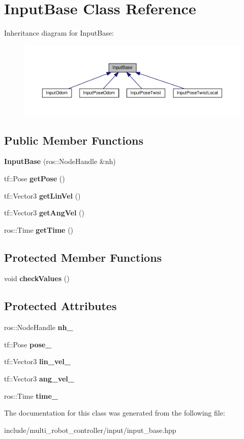 \hypertarget{classInputBase}{}\section{Input\+Base Class Reference}
\label{classInputBase}


Inheritance diagram for Input\+Base\+:
\nopagebreak
\begin{figure}[H]
\begin{center}
\leavevmode
\includegraphics[width=350pt]{d8/d2a/classInputBase__inherit__graph}
\end{center}
\end{figure}
\subsection*{Public Member Functions}
\begin{DoxyCompactItemize}
\item 
{\bfseries Input\+Base} (ros\+::\+Node\+Handle \&nh)
\item 
tf\+::\+Pose {\bfseries get\+Pose} ()
\item 
tf\+::\+Vector3 {\bfseries get\+Lin\+Vel} ()
\item 
tf\+::\+Vector3 {\bfseries get\+Ang\+Vel} ()
\item 
ros\+::\+Time {\bfseries get\+Time} ()
\end{DoxyCompactItemize}
\subsection*{Protected Member Functions}
\begin{DoxyCompactItemize}
\item 
void {\bfseries check\+Values} ()
\end{DoxyCompactItemize}
\subsection*{Protected Attributes}
\begin{DoxyCompactItemize}
\item 
ros\+::\+Node\+Handle {\bfseries nh\+\_\+}
\item 
tf\+::\+Pose {\bfseries pose\+\_\+}
\item 
tf\+::\+Vector3 {\bfseries lin\+\_\+vel\+\_\+}
\item 
tf\+::\+Vector3 {\bfseries ang\+\_\+vel\+\_\+}
\item 
ros\+::\+Time {\bfseries time\+\_\+}
\end{DoxyCompactItemize}


The documentation for this class was generated from the following file\+:\begin{DoxyCompactItemize}
\item 
include/multi\+\_\+robot\+\_\+controller/input/input\+\_\+base.\+hpp\end{DoxyCompactItemize}
